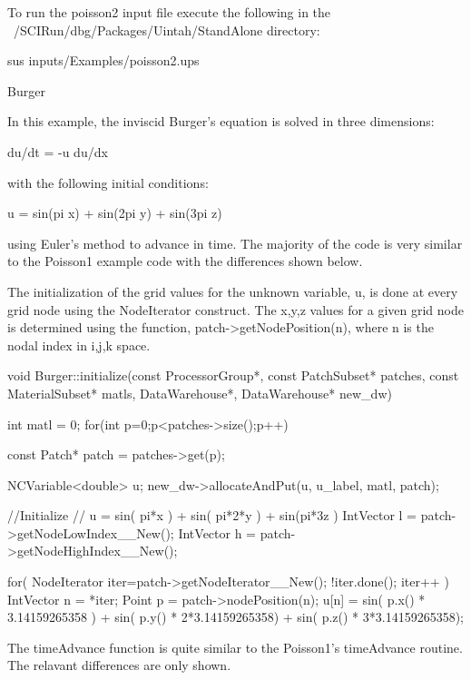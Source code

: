 \documentclass[12pt]{report}
\begin{document}
To run the poisson2 input file execute the following in the ~/SCIRun/dbg/Packages/Uintah/StandAlone directory:

	sus inputs/Examples/poisson2.ups



Burger

In this example, the inviscid Burger's equation is solved in three dimensions:

	du/dt = -u du/dx  

 with the following initial conditions:

	u = sin(pi x) + sin(2pi y) + sin(3pi z)

using Euler's method to advance in time.   The majority of the code is very similar to the Poisson1 example code with the differences shown below.  

The initialization of the grid values for the unknown variable, u, is done at every grid node using the NodeIterator construct.  The x,y,z values for a given grid node is determined using the function, patch->getNodePosition(n), where n is the nodal index in i,j,k space.

void Burger::initialize(const ProcessorGroup*,
                        const PatchSubset* patches,
                        const MaterialSubset* matls,
                        DataWarehouse*, 
                        DataWarehouse* new_dw)
{
  int matl = 0;
  for(int p=0;p<patches->size();p++){
    const Patch* patch = patches->get(p);

    NCVariable<double> u;
    new_dw->allocateAndPut(u, u_label, matl, patch);

    //Initialize
    // u = sin( pi*x ) + sin( pi*2*y ) + sin(pi*3z )
    IntVector l = patch->getNodeLowIndex__New();
    IntVector h = patch->getNodeHighIndex__New();
    
    for( NodeIterator iter=patch->getNodeIterator__New(); !iter.done(); iter++ ){
      IntVector n = *iter;
      Point p = patch->nodePosition(n);
      u[n] = sin( p.x() * 3.14159265358 ) + sin( p.y() * 2*3.14159265358)  +  sin( p.z() * 3*3.14159265358);
    }
  }
}

The timeAdvance function is quite similar to the Poisson1's timeAdvance routine.   The relavant differences are only shown.
\end{document}
